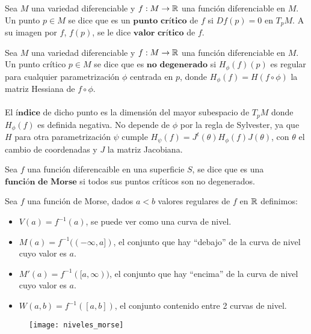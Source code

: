 \begin{definicion} Sea $M$ una variedad diferenciable y $f: M \rightarrow \mathbb{R}$ una función diferenciable en $M$. Un punto $p \in M$ se dice que es un $\textbf{punto crítico}$ de $f$ si $Df(p) = 0$ en $T_pM$. A su imagen por $f$, $f(p)$, se le dice $\textbf{valor crítico}$ de $f$.
\end{definicion}

\begin{definicion} Sea $M$ una variedad diferenciable y $f: M \rightarrow \mathbb{R}$ una función diferenciable en $M$. Un punto crítico $p \in M$ se dice que es $\textbf{no degenerado}$ si $H_\phi(f)(p)$ es regular para cualquier parametrización $\phi$ centrada en $p$, donde $H_\phi(f)=H(f \circ \phi)$ la matriz Hessiana de $f \circ \phi$.\\ 
\\ El $\textbf{índice}$ de dicho punto es la dimensión del mayor subespacio de $T_pM$ donde $H_\phi(f)$ es definida negativa. No depende de $\phi$ por la regla de Sylvester, ya que $H$ para otra parametrización $\psi$ cumple $H_\psi(f) = J^t(\theta) H_\phi(f) J(\theta)$, con $\theta$ el cambio de coordenadas y $J$ la matriz Jacobiana.
\end{definicion}

\begin{definicion} Sea $f$ una función diferencaible en una superficie $S$, se dice que es una $\textbf{función de Morse}$ si todos sus puntos críticos son no degenerados.
\end{definicion}

\begin{definicion} Sea $f$ una función de Morse, dados $a < b$ valores regulares de $f$ en $\mathbb{R}$ definimos:
	\begin{itemize}
		\item $V(a) = f^{-1}(a)$, se puede ver como una curva de nivel.
		\item $M(a) = f^{-1}((-\infty, a])$, el conjunto que hay ``debajo'' de la curva de nivel cuyo valor es $a$.
		\item $M'(a) = f^{-1}([a,\infty))$, el conjunto que hay ``encima'' de la curva de nivel cuyo valor es $a$.
		\item $W(a,b) = f^{-1}([a,b])$, el conjunto contenido entre 2 curvas de nivel.
	\end{itemize}
\end{definicion}

\begin{figure}[h]
  	\centering
  	\texttt{[image: niveles\_morse]}
  	\label{fig:niveles_morse}
\end{figure}

\endinput
